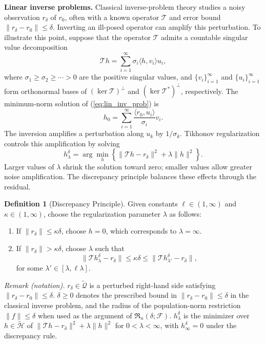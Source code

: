 \documentclass[12pt]{article}
\theoremstyle{plain}
\theoremstyle{definition}
\newtheorem{definition}[theorem]{Definition}
\theoremstyle{remark}
\begin{document}
\textbf{Linear inverse problems.} Classical inverse-problem theory studies a noisy observation $r_\delta$ of $r_0$, often with a known operator $\mathcal T$ and error bound $\|r_\delta-r_0\|\leqslant\delta$. Inverting an ill-posed operator can amplify this perturbation. To illustrate this point, suppose that the operator $ \mathcal{T}$ admits a countable singular value decomposition 
\begin{equation}\label{eq:svd}
\mathcal{T} h =\sum _{i=1}^{\infty } \sigma _{i} \langle h,v_{i} \rangle u_{i} ,
\end{equation}
where $\sigma_1\geqslant\sigma_2\geqslant\cdots>0$ are the positive singular values, and $\{v_i\}_{i=1}^{\infty}$ and $\{u_i\}_{i=1}^{\infty}$ form orthonormal bases of $(\ker\mathcal T)^\perp$ and $(\ker\mathcal T^*)^\perp$, respectively. The minimum-norm solution of (\ref{eq:lin_inv_prob}) is
\[
h_{0} =\sum _{i=1}^{\infty }\frac{\langle r_{0} ,u_{i} \rangle }{\sigma _{i}} v_{i} .
\]
The inversion amplifies a perturbation along $u_k$ by $1/\sigma_k$. Tikhonov regularization controls this amplification by solving
\begin{equation}\label{eq:tikh_sol}
h_{\lambda }^{\delta }=\arg\min_{h}\left\{\| \mathcal{T} h-r_{\delta} \| ^{2}+\lambda \| h\| ^{2}\right\}.
\end{equation}
Larger values of $\lambda$ shrink the solution toward zero; smaller values allow greater noise amplification. The discrepancy principle balances these effects through the residual. 
\begin{definition}[Discrepancy Principle]\label{def:dp} Given constants $\ell\in(1,\infty)$ and $\kappa\in(1,\infty)$, choose the regularization parameter $\lambda$ as follows:
\begin{enumerate}
    \item If $ \| r_{\delta } \| \leqslant \kappa \delta $, choose $ h=0$, which corresponds to $ \lambda =\infty $.
    \item If $ \| r_{\delta } \|  >\kappa \delta $, choose $ \lambda $ such that 
    \[
\| \mathcal{T} h_{\lambda }^{\delta } -r_{\delta } \| \leqslant \kappa \delta \leqslant \| \mathcal{T} h_{\lambda '}^{\delta } -r_{\delta } \| ,
\]
    for some $ \lambda '\in [ \lambda ,\ell \lambda ]$.
\end{enumerate}

\noindent\textit{Remark (notation).} $r_\delta\in\tilde{\mathcal Q}$ is a perturbed right-hand side satisfying $\|r_\delta-r_0\|\leqslant\delta$. $\delta\geqslant0$ denotes the prescribed bound in $\|r_\delta-r_0\|\leqslant\delta$ in the classical inverse problem, and the radius of the population-norm restriction $\|f\|\leqslant\delta$ when used as the argument of $\mathfrak R_n(\delta;\mathcal F)$. $h_\lambda^\delta$ is the minimizer over $h\in\tilde{\mathcal H}$ of $\|\mathcal T h-r_\delta\|^2+\lambda\|h\|^2$ for $0<\lambda<\infty$, with $h_\infty^\delta=0$ under the discrepancy rule.


\end{definition}
\end{document}

